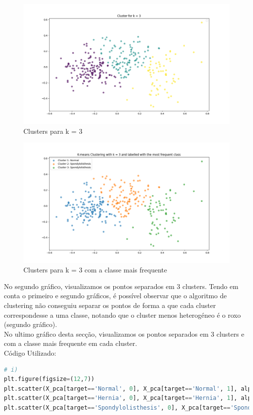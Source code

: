\documentclass[a4paper,12pt]{article} %
\begin{document}
\begin{enumerate}
\begin{figure}[H]
    \centering
    \includegraphics[width=0.8\linewidth]{ex3_cluster.png}
    \captionsetup{font=small} 
    \caption{Clusters para k = 3}
\end{figure}

\begin{figure}[H]
    \centering
    \includegraphics[width=0.8\linewidth]{ex3_cluster_labelled.png}
    \captionsetup{font=small} 
    \caption{Clusters para k = 3 com a classe mais frequente}
\end{figure}

No segundo gráfico, visualizamos os pontos separados em 3 clusters. Tendo em conta o primeiro e segundo gráficos, é possível observar que o algoritmo de clustering não conseguiu separar os pontos de forma a que cada cluster correspondesse a uma classe, notando que o cluster menos heterogéneo é o roxo (segundo gráfico). \\
No ultimo gráfico desta secção, visualizamos os pontos separados em 3 clusters e com a classe mais frequente em cada cluster. \\

Código Utilizado: 

\begin{lstlisting}[language=Python]
# i)
plt.figure(figsize=(12,7))
plt.scatter(X_pca[target=='Normal', 0], X_pca[target=='Normal', 1], alpha=0.6, label='Normal')
plt.scatter(X_pca[target=='Hernia', 0], X_pca[target=='Hernia', 1], alpha=0.6, label='Hernia')
plt.scatter(X_pca[target=='Spondylolisthesis', 0], X_pca[target=='Spondylolisthesis', 1], alpha=0.6, label='Spondylolisthesis')


\end{lstlisting}
\end{enumerate}
\end{document}
